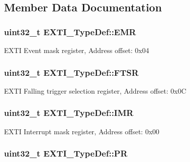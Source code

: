 \subsection{Member Data Documentation}
\hypertarget{struct_e_x_t_i___type_def_a9c5bff67bf9499933959df7eb91a1bd6}{
\subsubsection[{E\-M\-R}]{ uint32\-\_\-t E\-X\-T\-I\-\_\-\-Type\-Def\-::\-E\-M\-R}}\label{struct_e_x_t_i___type_def_a9c5bff67bf9499933959df7eb91a1bd6}
E\-X\-T\-I Event mask register, Address offset\-: 0x04 \hypertarget{struct_e_x_t_i___type_def_aee667dc148250bbf37fdc66dc4a9874d}{
\subsubsection[{F\-T\-S\-R}]{ uint32\-\_\-t E\-X\-T\-I\-\_\-\-Type\-Def\-::\-F\-T\-S\-R}}\label{struct_e_x_t_i___type_def_aee667dc148250bbf37fdc66dc4a9874d}
E\-X\-T\-I Falling trigger selection register, Address offset\-: 0x0\-C \hypertarget{struct_e_x_t_i___type_def_a17d061db586d4a5aa646b68495a8e6a4}{
\subsubsection[{I\-M\-R}]{ uint32\-\_\-t E\-X\-T\-I\-\_\-\-Type\-Def\-::\-I\-M\-R}}\label{struct_e_x_t_i___type_def_a17d061db586d4a5aa646b68495a8e6a4}
E\-X\-T\-I Interrupt mask register, Address offset\-: 0x00 \hypertarget{struct_e_x_t_i___type_def_a133294b87dbe6a01e8d9584338abc39a}{
\subsubsection[{P\-R}]{ uint32\-\_\-t E\-X\-T\-I\-\_\-\-Type\-Def\-::\-P\-R}}\label{struct_e_x_t_i___type_def_a133294b87dbe6a01e8d9584338abc39a}
